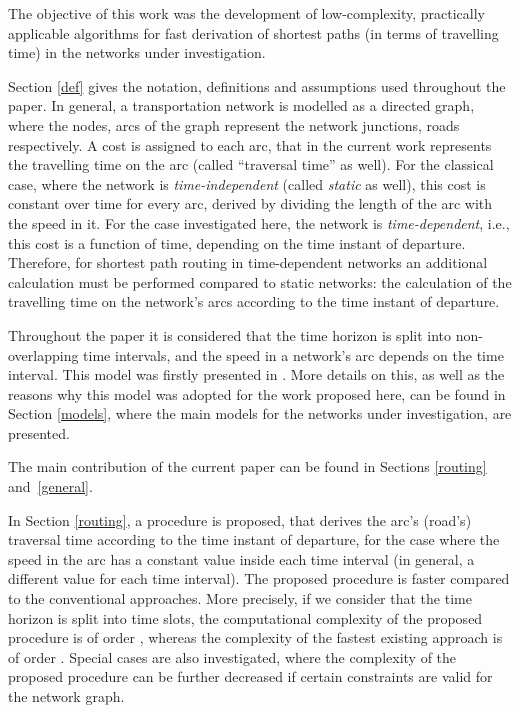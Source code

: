\documentclass[conference]{IEEEtran}
\begin{document}
The objective of this work was the development of low-complexity, practically applicable algorithms for fast derivation of shortest paths (in terms of travelling time) in the networks under investigation.      

Section \ref{def} gives the notation, definitions and assumptions used throughout the paper. In general, a transportation network is modelled as a directed graph, where the nodes, arcs of the graph represent the network junctions, roads respectively. A cost is assigned to each arc, that in the current work represents the travelling time on the arc (called ``traversal time'' as well). For the classical case, where the network is \emph{time-independent} (called \emph{static} as well), this cost is constant over time for every arc, derived by dividing the length of the arc with the speed in it.  For the case investigated here, the network is \emph{time-dependent}, i.e., this cost is a function of time, depending on the time instant of departure. Therefore, for shortest path routing in time-dependent networks an additional calculation must be performed compared to static networks: the calculation of the travelling time on the network's arcs according to the time instant of departure. 

Throughout the paper it is considered that the time horizon is split into non-overlapping time intervals, and the speed in a network's arc depends on the time interval. This model was firstly presented in \cite{Sung}. More details on this, as well as the reasons why this model was adopted for the work proposed here, can be found in Section \ref{models}, where the main models for the networks under investigation, are presented.  

The main contribution of the current paper can be found in Sections \ref{routing} and~\ref{general}. 

In Section \ref{routing}, a procedure is proposed, that derives the arc's (road's) traversal time according to the time instant of departure, for the case where the speed in the arc has a constant value inside each time interval (in general, a different value for each time interval). The proposed procedure is faster compared to the conventional approaches. More precisely, if we consider that the time horizon is split into  time slots, the computational complexity of the proposed procedure is of order , whereas the complexity of the fastest existing approach is of order . Special cases are also investigated, where the complexity of the proposed procedure can be further decreased if certain constraints are valid for the network graph. 
\end{document}

